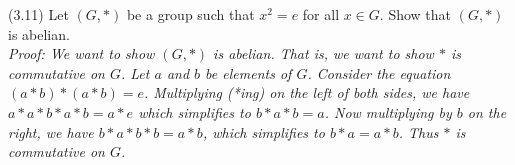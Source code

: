 \documentclass{scrartcl}
\begin{document}
(3.11) Let $(G,*)$ be a group such that $x^2=e$ for all $x \in G$. Show that $(G,*)$ is abelian.\\
\em Proof: \em We want to show $(G,*)$ is abelian. That is, we want to show $*$ is commutative on $G$. Let $a$ and $b$ be elements of $G$. Consider the equation $(a*b)*(a*b)=e$. Multiplying (*ing) on the left of both sides, we have $a*a*b*a*b=a*e$ which simplifies to $b*a*b=a$. Now multiplying by $b$ on the right, we have $b*a*b*b=a*b$, which simplifies to $b*a=a*b$. Thus $*$ is commutative on $G$.
\end{document}
